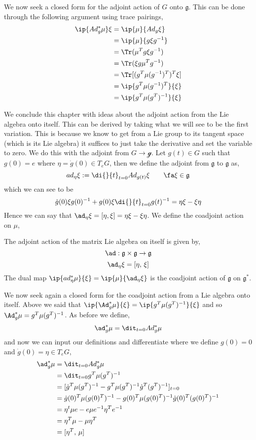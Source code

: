 \noindent
We now seek a closed form for the adjoint action of $G$ onto $\mathfrak{g}$. This can be done through the following argument using trace pairings,
\begin{align*}
  \ip {Ad^*_g \mu} \xi &= \ip {\mu} {Ad_g\xi}\\
  &= \ip {\mu} {g\xi g^{-1}}\\
  &= \Tr(\mu^Tg\xi g^{-1})\\
  &= \Tr(\xi g\mu^Tg^{-1})\\
  &= \Tr [(g^T\mu(g^{-1})^T)^T\xi]\\
  &= \ip{g^T\mu (g^{-1})^T} {\xi}\\
  &= \ip{g^T\mu (g^T)^{-1}} {\xi}\\
\end{align*}

\noindent
We conclude this chapter with ideas about the adjoint action from the Lie algebra onto itself. This can be derived by taking what we will see to be the first variation. This is because we know to get from a Lie group to its tangent space (which is its Lie algebra) it suffices to just take the derivative and set the variable to zero. We do this with the adjoint from $G \to \mathcal{g}$. Let $g(t) \in G$ such that $g(0) = e$ where $\eta = \dot g (0) \in T_eG$, then we define the adjoint from $\mathfrak{g}$ to $\mathfrak{g}$ as,
$$ ad_\eta \xi := \di {}{t} _{t = 0} Ad_{g(t)}\xi \qquad \fa \xi \in \mathfrak{g} $$
which we can see to be
$$ \dot g(0)\xi g(0)^{-1} + g(0)\xi \di {}{t}_{t=0} g(t)^{-1}= \eta\xi - \xi\eta $$
Hence we can say that $\ad_{\eta}\xi = [\eta, \xi] = \eta\xi - \xi\eta$. We define the coadjoint action on $\mu$,
\begin{ndefi}
  The adjoint action of the matrix Lie algebra on itself is given by,
  $$ \ad : \mathfrak{g}\times \mathfrak{g} \to \mathfrak{g} $$
  $$ \ad_\eta \xi = [\eta,\, \xi] $$
  The dual map $\ip{ad^*_\eta \mu}{\xi} = \ip{\mu}{\ad_\eta \xi}$ is the coadjoint action of $\mathfrak{g}$ on $\mathfrak{g}^*$.
\end{ndefi}
\noindent
We now seek again a closed form for the coadjoint action from a Lie algebra onto itself. Above we said that $\ip{\Ad^*_g\mu}{\xi} = \ip{g^T \mu (g^T)^{-1}}{\xi}$ and so $\Ad^*_g \mu = g^T \mu (g^T)^{-1}$. As before we define,
$$ \ad^*_g \mu = \dit_{t=0} Ad_g^* \mu $$
and now we can input our definitions and differentiate where we define $g(0) = 0$ and $\dot g (0) = \eta \in T_eG$,
\begin{align*}
  \ad^*_g \mu &= \dit_{t=0} Ad_g^* \mu \\
  &= \dit_{t=0} g^T \mu (g^T)^{-1} \\
  &= [\dot g^T \mu (g^T)^{-1} - g^T \mu (g^T)^{-1}\dot g^T (g^T)^{-1}]_{t=0} \\
  &= \dot g(0)^T \mu (g(0)^T)^{-1} - g(0)^T \mu (g(0)^T)^{-1}\dot g(0)^T (g(0)^T)^{-1} \\
  &= \eta^t \mu e - e \mu e^{-1} \eta^T e^{-1} \\
  &= \eta^T \mu - \mu \eta^T \\
  &= [\eta^T,\,\mu]
\end{align*}
